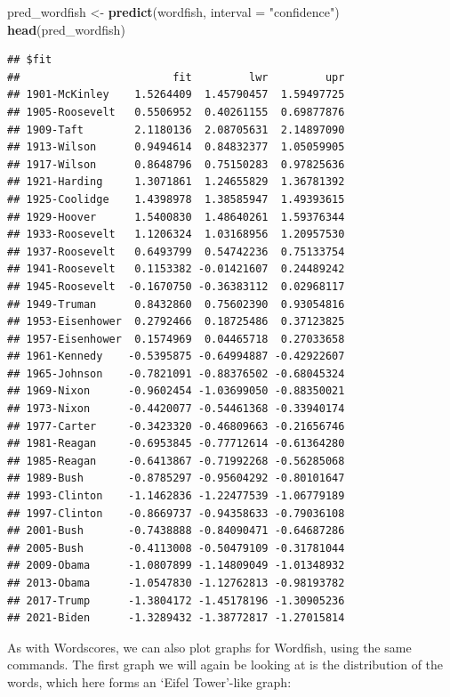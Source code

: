 \documentclass[
]{book}
\newenvironment{Shaded}{\begin{snugshade}}{\end{snugshade}}
\newcommand{\AttributeTok}[1]{\textcolor[rgb]{0.13,0.29,0.53}{#1}}
\newcommand{\FunctionTok}[1]{\textcolor[rgb]{0.13,0.29,0.53}{\textbf{#1}}}
\newcommand{\NormalTok}[1]{#1}
\newcommand{\OtherTok}[1]{\textcolor[rgb]{0.56,0.35,0.01}{#1}}
\newcommand{\StringTok}[1]{\textcolor[rgb]{0.31,0.60,0.02}{#1}}
\begin{document}
\begin{Shaded}
\begin{Highlighting}[]
\NormalTok{pred\_wordfish }\OtherTok{\textless{}{-}} \FunctionTok{predict}\NormalTok{(wordfish, }\AttributeTok{interval =} \StringTok{"confidence"}\NormalTok{)}
\FunctionTok{head}\NormalTok{(pred\_wordfish)}
\end{Highlighting}
\end{Shaded}

\begin{verbatim}
## $fit
##                        fit         lwr         upr
## 1901-McKinley    1.5264409  1.45790457  1.59497725
## 1905-Roosevelt   0.5506952  0.40261155  0.69877876
## 1909-Taft        2.1180136  2.08705631  2.14897090
## 1913-Wilson      0.9494614  0.84832377  1.05059905
## 1917-Wilson      0.8648796  0.75150283  0.97825636
## 1921-Harding     1.3071861  1.24655829  1.36781392
## 1925-Coolidge    1.4398978  1.38585947  1.49393615
## 1929-Hoover      1.5400830  1.48640261  1.59376344
## 1933-Roosevelt   1.1206324  1.03168956  1.20957530
## 1937-Roosevelt   0.6493799  0.54742236  0.75133754
## 1941-Roosevelt   0.1153382 -0.01421607  0.24489242
## 1945-Roosevelt  -0.1670750 -0.36383112  0.02968117
## 1949-Truman      0.8432860  0.75602390  0.93054816
## 1953-Eisenhower  0.2792466  0.18725486  0.37123825
## 1957-Eisenhower  0.1574969  0.04465718  0.27033658
## 1961-Kennedy    -0.5395875 -0.64994887 -0.42922607
## 1965-Johnson    -0.7821091 -0.88376502 -0.68045324
## 1969-Nixon      -0.9602454 -1.03699050 -0.88350021
## 1973-Nixon      -0.4420077 -0.54461368 -0.33940174
## 1977-Carter     -0.3423320 -0.46809663 -0.21656746
## 1981-Reagan     -0.6953845 -0.77712614 -0.61364280
## 1985-Reagan     -0.6413867 -0.71992268 -0.56285068
## 1989-Bush       -0.8785297 -0.95604292 -0.80101647
## 1993-Clinton    -1.1462836 -1.22477539 -1.06779189
## 1997-Clinton    -0.8669737 -0.94358633 -0.79036108
## 2001-Bush       -0.7438888 -0.84090471 -0.64687286
## 2005-Bush       -0.4113008 -0.50479109 -0.31781044
## 2009-Obama      -1.0807899 -1.14809049 -1.01348932
## 2013-Obama      -1.0547830 -1.12762813 -0.98193782
## 2017-Trump      -1.3804172 -1.45178196 -1.30905236
## 2021-Biden      -1.3289432 -1.38772817 -1.27015814
\end{verbatim}

As with Wordscores, we can also plot graphs for Wordfish, using the same commands. The first graph we will again be looking at is the distribution of the words, which here forms an `Eifel Tower'-like graph:
\end{document}
